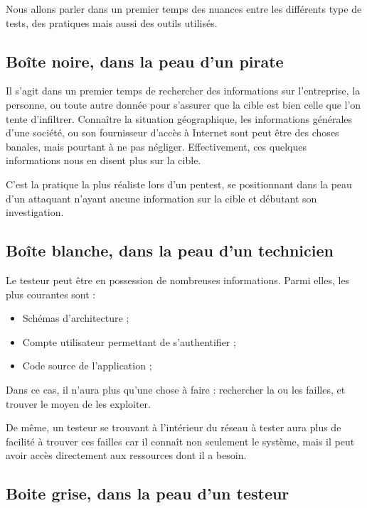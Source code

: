 \documentclass[a4paper]{memoir}
\begin{document}
Nous allons parler dans un premier temps des nuances entre les différents type de tests, des pratiques mais aussi des outils utilisés.

\subsection{Boîte noire, dans la peau d'un pirate}

Il s'agit dans un premier temps de rechercher des informations sur l'entreprise, la personne, ou toute autre donnée pour s'assurer que la cible est bien celle que l'on tente d'infiltrer. Connaître la situation géographique, les informations générales d'une société, ou son fournisseur d'accès à Internet sont peut être des choses banales, mais pourtant à ne pas négliger. Effectivement, ces quelques informations nous en disent plus sur la cible.

C'est la pratique la plus réaliste lors d'un pentest, se positionnant dans la peau d'un attaquant n'ayant aucune information sur la cible et débutant son investigation.

\subsection{Boîte blanche, dans la peau d'un technicien}

Le testeur peut être en possession de nombreuses informations. Parmi elles, les plus courantes sont :

\begin{itemize}
   \item Schémas d'architecture ;
   \item Compte utilisateur permettant de s'authentifier ;
   \item Code source de l'application ;
\end{itemize}

Dans ce cas, il n'aura plus qu'une chose à faire : rechercher la ou les failles, et trouver le moyen de les exploiter.

De même, un testeur se trouvant à l'intérieur du réseau à tester aura plus de facilité à trouver ces failles car il connaît non seulement le système, mais il peut avoir accès directement aux ressources dont il a besoin.

\subsection{Boite grise, dans la peau d'un testeur}
\end{document}
